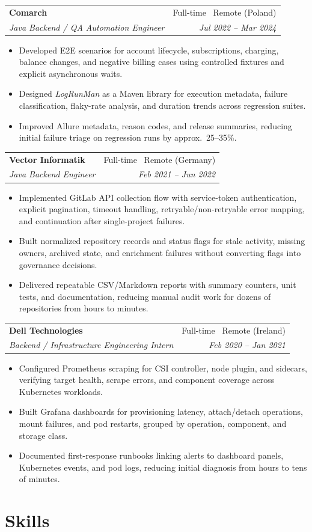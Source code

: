 \documentclass[a4paper,10pt]{article}
\makeatletter
\newcommand{\resumeSubheading}[4]{
    \vspace{-3pt}
    \begin{tabular*}{\textwidth}{l@{\extracolsep{\fill}}r}
    \textbf{#1} & #2 \\
    \textit{\small#3} & \textit{\small #4} \\
    \end{tabular*}
    \vspace{-5pt}
}
\newcommand{\resumeItemListStart}{\begin{itemize}[leftmargin=*, itemsep=0.5pt, topsep=2pt]}
\newcommand{\resumeItemListEnd}{\end{itemize}\vspace{-1pt}}
\newcommand{\resumeItem}[1]{\item \small{#1}}
\makeatother
\begin{document}
\vspace{5pt}
\resumeSubheading
{Comarch}{Full-time \textbar\ Remote (Poland)}
{Java Backend / QA Automation Engineer}{Jul 2022 -- Mar 2024}
\resumeItemListStart
\resumeItem{Developed E2E scenarios for account lifecycle, subscriptions, charging, balance changes, and negative billing cases using controlled fixtures and explicit asynchronous waits.}
\resumeItem{Designed \textit{LogRunMan} as a Maven library for execution metadata, failure classification, flaky-rate analysis, and duration trends across regression suites.}
\resumeItem{Improved Allure metadata, reason codes, and release summaries, reducing initial failure triage on regression runs by approx.\ 25--35\%.}
\resumeItemListEnd

\vspace{5pt}
\resumeSubheading
{Vector Informatik}{Full-time \textbar\ Remote (Germany)}
{Java Backend Engineer}{Feb 2021 -- Jun 2022}
\resumeItemListStart
\resumeItem{Implemented GitLab API collection flow with service-token authentication, explicit pagination, timeout handling, retryable/non-retryable error mapping, and continuation after single-project failures.}
\resumeItem{Built normalized repository records and status flags for stale activity, missing owners, archived state, and enrichment failures without converting flags into governance decisions.}
\resumeItem{Delivered repeatable CSV/Markdown reports with summary counters, unit tests, and documentation, reducing manual audit work for dozens of repositories from hours to minutes.}
\resumeItemListEnd

\vspace{5pt}
\resumeSubheading
{Dell Technologies}{Full-time \textbar\ Remote (Ireland)}
{Backend / Infrastructure Engineering Intern}{Feb 2020 -- Jan 2021}
\resumeItemListStart
\resumeItem{Configured Prometheus scraping for CSI controller, node plugin, and sidecars, verifying target health, scrape errors, and component coverage across Kubernetes workloads.}
\resumeItem{Built Grafana dashboards for provisioning latency, attach/detach operations, mount failures, and pod restarts, grouped by operation, component, and storage class.}
\resumeItem{Documented first-response runbooks linking alerts to dashboard panels, Kubernetes events, and pod logs, reducing initial diagnosis from hours to tens of minutes.}
\resumeItemListEnd

\section{Skills}
\end{document}
